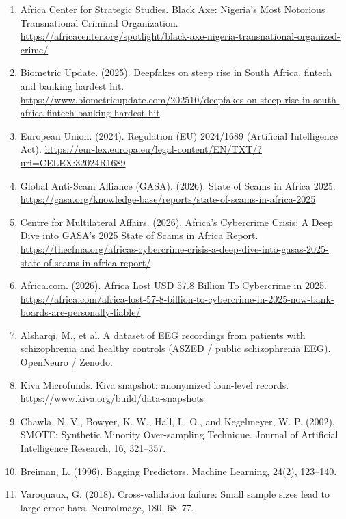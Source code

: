{\begin{enumerate}
\item Africa Center for Strategic Studies. Black Axe: Nigeria's Most Notorious Transnational Criminal Organization. \url{https://africacenter.org/spotlight/black-axe-nigeria-transnational-organized-crime/}
\item Biometric Update. (2025). Deepfakes on steep rise in South Africa, fintech and banking hardest hit. \url{https://www.biometricupdate.com/202510/deepfakes-on-steep-rise-in-south-africa-fintech-banking-hardest-hit}
\item European Union. (2024). Regulation (EU) 2024/1689 (Artificial Intelligence Act). \url{https://eur-lex.europa.eu/legal-content/EN/TXT/?uri=CELEX:32024R1689}
\item Global Anti-Scam Alliance (GASA). (2026). State of Scams in Africa 2025. \url{https://gasa.org/knowledge-base/reports/state-of-scams-in-africa-2025}
\item Centre for Multilateral Affairs. (2026). Africa's Cybercrime Crisis: A Deep Dive into GASA's 2025 State of Scams in Africa Report. \url{https://thecfma.org/africas-cybercrime-crisis-a-deep-dive-into-gasas-2025-state-of-scams-in-africa-report/}
\item Africa.com. (2026). Africa Lost USD 57.8 Billion To Cybercrime in 2025. \url{https://africa.com/africa-lost-57-8-billion-to-cybercrime-in-2025-now-bank-boards-are-personally-liable/}
\item Alsharqi, M., et al. A dataset of EEG recordings from patients with schizophrenia and healthy controls (ASZED / public schizophrenia EEG). OpenNeuro / Zenodo.
\item Kiva Microfunds. Kiva snapshot: anonymized loan-level records. \url{https://www.kiva.org/build/data-snapshots}
\item Chawla, N. V., Bowyer, K. W., Hall, L. O., and Kegelmeyer, W. P. (2002). SMOTE: Synthetic Minority Over-sampling Technique. Journal of Artificial Intelligence Research, 16, 321--357.
\item Breiman, L. (1996). Bagging Predictors. Machine Learning, 24(2), 123--140.
\item Varoquaux, G. (2018). Cross-validation failure: Small sample sizes lead to large error bars. NeuroImage, 180, 68--77.
\end{enumerate}}